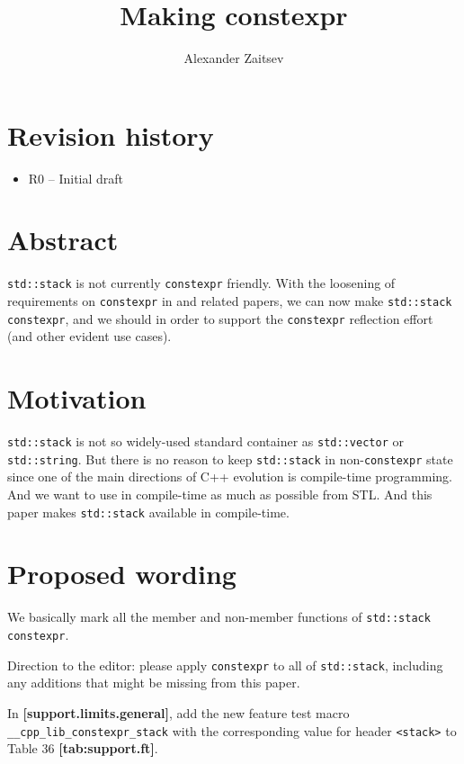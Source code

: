 \documentclass{wg21}
\title{Making \cc{std::stack} constexpr}
\author{Alexander Zaitsev}{zamazan4ik@tut.by, zamazan4ik@gmail.com}
\newcommand{\cc}[1]{\texttt{#1}}
\begin{document}
\maketitle

\section{Revision history}
\begin{itemize}
  \item R0 -- Initial draft
\end{itemize}


\section{Abstract}
\cc{std::stack} is not currently \cc{constexpr} friendly. With the loosening
of requirements on \cc{constexpr} in \cite{P0784R1} and related papers, we
can now make \cc{std::stack} \cc{constexpr}, and we should in order to support
the \cc{constexpr} reflection effort (and other evident use cases).

\section{Motivation}
\cc{std::stack} is not so widely-used standard container as \cc{std::vector} or \cc{std::string}. But there is no reason to keep \cc{std::stack} in non-\cc{constexpr} state since one of the main directions of C++ evolution is compile-time programming. And we want to use in compile-time as much as possible from STL. And this paper makes \cc{std::stack} available in compile-time.

\section{Proposed wording}
We basically mark all the member and non-member functions of \cc{std::stack} \cc{constexpr}.

Direction to the editor: please apply \cc{constexpr} to all of \cc{std::stack},
including any additions that might be missing from this paper.

In \textbf{[support.limits.general]}, add the new feature test macro
\cc{__cpp_lib_constexpr_stack} with the corresponding value for header
\cc{<stack>} to Table 36 \textbf{[tab:support.ft]}.
\end{document}
